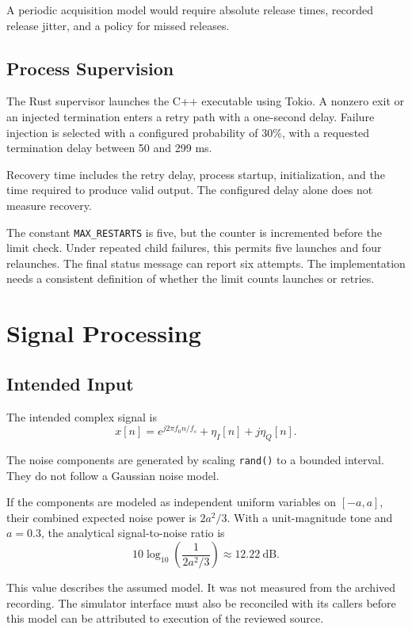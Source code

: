 \documentclass[conference]{IEEEtran}
\begin{document}
A periodic acquisition model would require absolute release
times, recorded release jitter, and a policy for missed
releases.

\subsection{Process Supervision}

The Rust supervisor launches the C++ executable using Tokio.
A nonzero exit or an injected termination enters a retry
path with a one-second delay. Failure injection is selected
with a configured probability of 30\%, with a requested
termination delay between 50 and 299 ms.

Recovery time includes the retry delay, process startup,
initialization, and the time required to produce valid
output. The configured delay alone does not measure
recovery.

The constant \texttt{MAX\_RESTARTS} is five, but the counter
is incremented before the limit check. Under repeated child
failures, this permits five launches and four relaunches.
The final status message can report six attempts.
The implementation needs a consistent definition of
whether the limit counts launches or retries.

\section{Signal Processing}

\subsection{Intended Input}

The intended complex signal is
\begin{equation}
x[n]=e^{j2\pi f_0n/f_s}+\eta_I[n]+j\eta_Q[n].
\end{equation}

The noise components are generated by scaling
\texttt{rand()} to a bounded interval. They do not follow
a Gaussian noise model.

If the components are modeled as independent uniform
variables on \([-a,a]\), their combined expected noise
power is \(2a^2/3\). With a unit-magnitude tone and
\(a=0.3\), the analytical signal-to-noise ratio is
\begin{equation}
10\log_{10}\left(\frac{1}{2a^2/3}\right)
\approx12.22\ \mathrm{dB}.
\end{equation}

This value describes the assumed model. It was not measured
from the archived recording. The simulator interface must
also be reconciled with its callers before this model can
be attributed to execution of the reviewed source.
\end{document}
